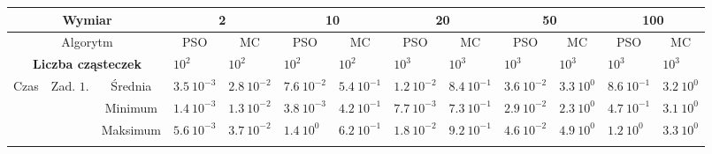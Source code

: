 \documentclass[11pt, a4paper, oneside]{article}
\begin{document}
\renewcommand{\arraystretch}{2}
\begin{table}[t]
\scriptsize
\begin{adjustwidth}{-1.76cm}{}
\centering
\begin{tabular}{|c|c|c|l|l|l|l|l|l|c|c|c|c|}
\hline
\multicolumn{3}{|c|}{Wymiar}                                   & \multicolumn{2}{c|}{2}                             & \multicolumn{2}{c|}{10}                            & \multicolumn{2}{c|}{20}                            & \multicolumn{2}{c|}{50}                                                         & \multicolumn{2}{c|}{100}                                                        \\ \hline
\multicolumn{3}{|c|}{Algorytm}                                 & \multicolumn{1}{c|}{PSO} & \multicolumn{1}{c|}{MC} & \multicolumn{1}{c|}{PSO} & \multicolumn{1}{c|}{MC} & \multicolumn{1}{c|}{PSO} & \multicolumn{1}{c|}{MC} & PSO                                    & MC                                     & PSO                                    & MC                                     \\ \hline
\multicolumn{3}{|c|}{\textbf{Liczba cząsteczek}}               & \textbf{$10^{2}$}        & \textbf{$10^{2}$}       & \textbf{$10^{2}$}        & \textbf{$10^{2}$}       & \textbf{$10^{3}$}        & \textbf{$10^{3}$}       & \multicolumn{1}{l|}{\textbf{$10^{3}$}} & \multicolumn{1}{l|}{\textbf{$10^{3}$}} & \multicolumn{1}{l|}{\textbf{$10^{3}$}} & \multicolumn{1}{l|}{\textbf{$10^{3}$}} \\ \hline
\multirow{4}{*}{Czas} & \multirow{4}{*}{Zad. $1$.} & Średnia   & $3.5 \ 10^{-3}$          & $2.8 \ 10^{-2}$         & $7.6 \ 10^{-2}$          & $5.4 \ 10^{-1}$         & $1.2 \ 10^{-2}$          & $8.4 \ 10^{-1}$         & \multicolumn{1}{l|}{$3.6 \ 10^{-2}$}   & \multicolumn{1}{l|}{$3.3 \ 10^{0}$}    & \multicolumn{1}{l|}{$8.6 \ 10^{-1}$}   & \multicolumn{1}{l|}{$3.2 \ 10^{0}$}    \\ \cline{3-13} 
                      &                            & Minimum   & $1.4 \ 10^{-3}$          & $1.3 \ 10^{-2}$         & $3.8 \ 10^{-3}$          & $4.2 \ 10^{-1}$         & $7.7 \ 10^{-3}$          & $7.3 \ 10^{-1}$         & \multicolumn{1}{l|}{$2.9 \ 10^{-2}$}   & \multicolumn{1}{l|}{$2.3 \ 10^{0}$}    & \multicolumn{1}{l|}{$4.7 \ 10^{-1}$}   & \multicolumn{1}{l|}{$3.1 \ 10^{0}$}    \\ \cline{3-13} 
                      &                            & Maksimum  & $5.6 \ 10^{-3}$          & $3.7 \ 10^{-2}$         & $1.4 \ 10^{0}$           & $6.2 \ 10^{-1}$         & $1.8 \ 10^{-2}$          & $9.2 \ 10^{-1}$         & \multicolumn{1}{l|}{$4.6 \ 10^{-2}$}   & \multicolumn{1}{l|}{$4.9 \ 10^{0}$}    & \multicolumn{1}{l|}{$1.2 \ 10^{0}$}    & \multicolumn{1}{l|}{$3.3 \ 10^{0}$}    \\ \cline{3-13} 

\end{tabular}
\end{adjustwidth}
\end{table}
\end{document}

